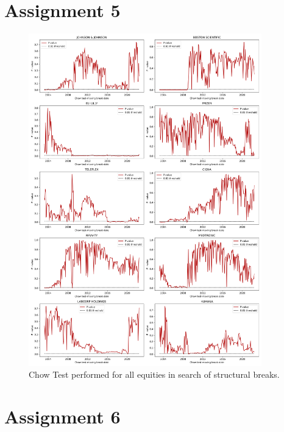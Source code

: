 \documentclass[12pt, openright, twoside]{report}
\begin{document}
\section*{Assignment 5}
\begin{figure}[h!]
    \centering
    \includegraphics[width=0.9\textwidth]{images/chowmoving.png}
    \caption{Chow Test performed for all equities in search of structural breaks.}\label{fig:chowmoving}
\end{figure}
\section*{Assignment 6}
\end{document}

